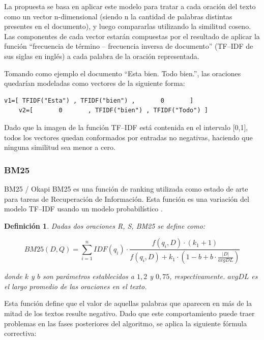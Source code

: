 \documentclass[a4paper]{article}
\newtheorem{definicion}{Definición}
\begin{document}
La propuesta se basa en aplicar este modelo para tratar a cada oración del texto como un vector n-dimensional (siendo n la cantidad de palabras distintas presentes en el documento), y luego compararlas utilizando la similitud coseno. Las componentes de cada vector estarán compuestas por el resultado de aplicar la función “frecuencia de término -- frecuencia inversa de documento” (TF--IDF de sus siglas en inglés) a cada palabra de la oración representada.

Tomando como ejemplo el documento “Esta bien. Todo bien.”, las oraciones quedarían modeladas como vectores de la siguiente forma:

\begin{center}
    \begin{Verbatim}[xleftmargin=3em]
    v1=[ TFIDF("Esta") , TFIDF("bien") ,       0       ]
    v2=[       0       , TFIDF("bien") , TFIDF("Todo") ]
    \end{Verbatim}
\end{center}

Dado que la imagen de la función TF--IDF está contenida en el intervalo [0,1], todos los vectores quedan conformados por entradas no negativas, haciendo que ninguna similitud sea menor a cero. 


\subsubsection{BM25}
BM25 / Okapi BM25 es una función de ranking utilizada como estado de arte para tareas de Recuperación de Información. 
Esta función es una variación del modelo TF--IDF usando un modelo probabilístico \cite{robertson}.

\begin{definicion}
Dadas dos oraciones R, S, BM25 se define como:

\begin{equation}
BM25(D,Q) = \sum_{i=1}^{n} IDF(q_i) \cdot \frac{f(q_i, D) \cdot (k_1 + 1)}{f(q_i, D) + k_1 \cdot (1 - b + b \cdot \frac{|D|}{avgDL})}
\end{equation}

donde $k$ y $b$ son parámetros establecidos a $1,2$ y $0,75$, respectivamente. $avgDL$ es el largo promedio de las oraciones en el texto.
\end{definicion}

Esta función define que el valor de aquellas palabras que aparecen en más de la mitad de los textos resulte negativo. 
Dado que este comportamiento puede traer problemas en las fases posteriores del algoritmo, se aplica la siguiente fórmula correctiva:
                
\end{document}
